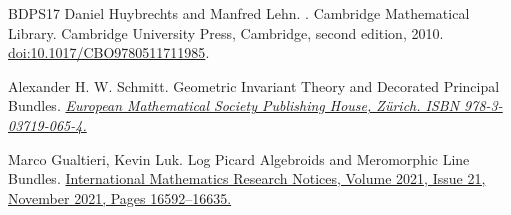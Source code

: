 \documentclass[12pt,reqno]{amsart}
\newcommand{\doi}[1]{\href{https://doi.org/#1}{doi:#1}}
\numberwithin{equation}{subsection}
\theoremstyle{definition}
\theoremstyle{theorem}
\begin{document}
\begin{thebibliography}{BDPS17}
	Daniel Huybrechts and Manfred Lehn.
	.
	\newblock Cambridge Mathematical Library. Cambridge University Press,
	Cambridge, second edition, 2010.
	\newblock \doi{10.1017/CBO9780511711985}.
	
	
	
	
	
	
	
	
	\newblock Alexander H. W. Schmitt.
	\newblock Geometric Invariant Theory and Decorated Principal Bundles.
	\newblock \href{https://ems.press/books/zlam/224}{\em European Mathematical Society Publishing House, Zürich. ISBN 978-3-03719-065-4.}
	
	\newblock Marco Gualtieri, Kevin Luk. 
	\newblock Log Picard Algebroids and Meromorphic Line Bundles.
	\newblock \href{https://doi.org/10.1093/imrn/rnz272}{International Mathematics Research Notices, Volume 2021, Issue 21, November 2021, Pages 16592–16635.}
	

\end{thebibliography}
\end{document}
